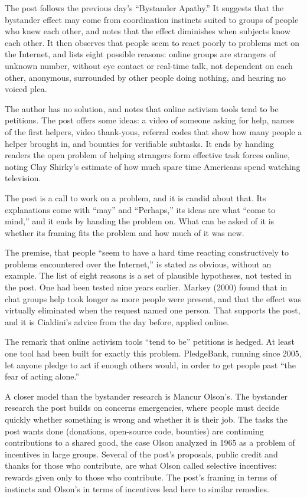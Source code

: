 \begin{afterword}
\summaryhead

The post follows the previous day's ``Bystander Apathy.'' It suggests that the bystander effect may come from coordination instincts suited to groups of people who knew each other, and notes that the effect diminishes when subjects know each other. It then observes that people seem to react poorly to problems met on the Internet, and lists eight possible reasons: online groups are strangers of unknown number, without eye contact or real-time talk, not dependent on each other, anonymous, surrounded by other people doing nothing, and hearing no voiced plea.

The author has no solution, and notes that online activism tools tend to be petitions. The post offers some ideas: a video of someone asking for help, names of the first helpers, video thank-yous, referral codes that show how many people a helper brought in, and bounties for verifiable subtasks. It ends by handing readers the open problem of helping strangers form effective task forces online, noting Clay Shirky's estimate of how much spare time Americans spend watching television.

\responsehead

The post is a call to work on a problem, and it is candid about that. Its explanations come with ``may'' and ``Perhaps,'' its ideas are what ``come to mind,'' and it ends by handing the problem on. What can be asked of it is whether its framing fits the problem and how much of it was new.

The premise, that people ``seem to have a hard time reacting constructively to problems encountered over the Internet,'' is stated as obvious, without an example. The list of eight reasons is a set of plausible hypotheses, not tested in the post. One had been tested nine years earlier. Markey (2000) found that in chat groups help took longer as more people were present, and that the effect was virtually eliminated when the request named one person. That supports the post, and it is Cialdini's advice from the day before, applied online.

The remark that online activism tools ``tend to be'' petitions is hedged. At least one tool had been built for exactly this problem. PledgeBank, running since 2005, let anyone pledge to act if enough others would, in order to get people past ``the fear of acting alone.''

A closer model than the bystander research is Mancur Olson's. The bystander research the post builds on concerns emergencies, where people must decide quickly whether something is wrong and whether it is their job. The tasks the post wants done (donations, open-source code, bounties) are continuing contributions to a shared good, the case Olson analyzed in 1965 as a problem of incentives in large groups. Several of the post's proposals, public credit and thanks for those who contribute, are what Olson called selective incentives: rewards given only to those who contribute. The post's framing in terms of instincts and Olson's in terms of incentives lead here to similar remedies.


\end{afterword}
